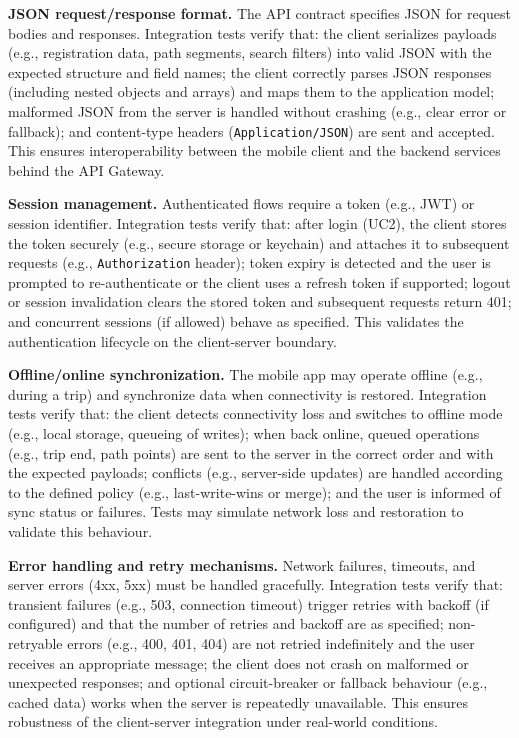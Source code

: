 \textbf{JSON request/response format.}
The API contract specifies JSON for request bodies and responses. Integration tests verify that: the client serializes payloads (e.g., registration data, path segments, search filters) into valid JSON with the expected structure and field names; the client correctly parses JSON responses (including nested objects and arrays) and maps them to the application model; malformed JSON from the server is handled without crashing (e.g., clear error or fallback); and content-type headers (\texttt{Application/JSON}) are sent and accepted. This ensures interoperability between the mobile client and the backend services behind the API Gateway.

\textbf{Session management.}
Authenticated flows require a token (e.g., JWT) or session identifier. Integration tests verify that: after login (UC2), the client stores the token securely (e.g., secure storage or keychain) and attaches it to subsequent requests (e.g., \texttt{Authorization} header); token expiry is detected and the user is prompted to re-authenticate or the client uses a refresh token if supported; logout or session invalidation clears the stored token and subsequent requests return 401; and concurrent sessions (if allowed) behave as specified. This validates the authentication lifecycle on the client-server boundary.

\textbf{Offline/online synchronization.}
The mobile app may operate offline (e.g., during a trip) and synchronize data when connectivity is restored. Integration tests verify that: the client detects connectivity loss and switches to offline mode (e.g., local storage, queueing of writes); when back online, queued operations (e.g., trip end, path points) are sent to the server in the correct order and with the expected payloads; conflicts (e.g., server-side updates) are handled according to the defined policy (e.g., last-write-wins or merge); and the user is informed of sync status or failures. Tests may simulate network loss and restoration to validate this behaviour.

\textbf{Error handling and retry mechanisms.}
Network failures, timeouts, and server errors (4xx, 5xx) must be handled gracefully. Integration tests verify that: transient failures (e.g., 503, connection timeout) trigger retries with backoff (if configured) and that the number of retries and backoff are as specified; non-retryable errors (e.g., 400, 401, 404) are not retried indefinitely and the user receives an appropriate message; the client does not crash on malformed or unexpected responses; and optional circuit-breaker or fallback behaviour (e.g., cached data) works when the server is repeatedly unavailable. This ensures robustness of the client-server integration under real-world conditions.

